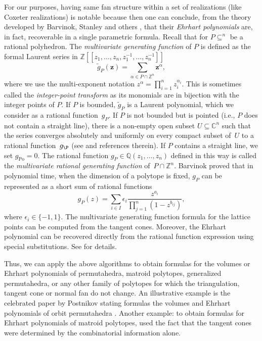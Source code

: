 \documentclass{amsart}
\theoremstyle{definition}
\def\Po{\mathrm{Po}}
\begin{document}
For our purposes, having same fan structure within a set of realizations (like Coxeter realizations) is notable because then one can conclude, from the theory developed by Barvinok, Stanley and others \cite{BarvinokPommersheim1999,Barvinok2008,Stanley2012}, that their \emph{Ehrhart polynomials} are, in fact, recoverable in a single parametric formula. Recall that for
$P \subseteq ^n$ be a rational polyhedron. The \emph{multivariate
  generating function} of $P$ is defined as the formal Laurent series in ${\mathbb Z}[[z_1,\ldots,z_n,z_1^{-1},\ldots,z_n^{-1}]]$
\begin{equation*}
\tilde g_P ( \mathbf{z} ) = \sum_{\alpha \in P \cap {\mathbb Z}^n} \mathbf{z}^\alpha ,
\end{equation*}
where we use the multi-exponent notation $ z^{\alpha} =
\prod_{i=1}^n z_i^{\alpha_i}$. This is sometimes called the \emph{integer-point transform} \cite{beckrobins} as its monomials are in bijection with the integer points of $P$. If $P$ is bounded, $\tilde g_P$ is a Laurent polynomial, which we consider as a rational function~$g_P$.
If $P$ is not bounded but is pointed (i.e., $P$ does not contain a
straight line), there is a non-empty open subset $U\subseteq {\mathbb C}^n$ such
that the series converges absolutely and uniformly on every compact
subset of~$U$ to a rational function~$g_\P$ (see \cite{BarvinokPommersheim1999} and
references therein).  If $P$ contains a straight line, we set $g_\Po =
0$.  The rational function $g_P\in {\mathbb Q}(z_1,\dots,z_n)$ defined in this
way is called the \emph{multivariate rational generating function}
of~$P\cap {\mathbb Z}^n$. Barvinok \cite{Barvinok2008} proved that in polynomial 
time, when the dimension of a polytope is fixed, $g_P$ can be represented
as a short sum of rational functions 
\begin{equation*}
 g_P( z) =  \sum_{i \in I} \epsilon_i \frac{z^{ a_{i}}}{\prod_{j=1}^{n} (1 - z^{ b_{ij}} )},
\end{equation*}
where $\epsilon_i \in \{-1,1\}$.
The multivariate generating function formula for the lattice points can be computed from the tangent cones. Moreover, the Ehrhart polynomial can be recovered directly from the rational function expression using special substitutions. See \cite{BarvinokPommersheim1999,Barvinok2008,beckrobins} for details. 

Thus, we can apply the above algorithms to obtain formulas for the volumes or Ehrhart polynomials of permutahedra, matroid polytopes, generalized permutahedra, or any other family of polytopes for which the triangulation, tangent cone or normal fan do not change. 
An illustrative example is the celebrated paper by Postnikov stating formulas the volumes and Ehrhart polynomials of orbit permutahedra \cite{Post09}. Another example: to obtain formulas for Ehrhart polynomials of matroid polytopes, \cite{DeLoeraHawsKoeppe} used the fact that the tangent cones were determined by the combinatorial information alone. 
\end{document}
